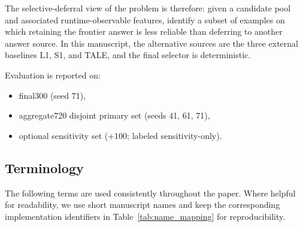 The selective-deferral view of the problem is therefore: given a candidate pool
and associated runtime-observable features, identify a subset of examples on which
retaining the frontier answer is less reliable than deferring to another answer
source. In this manuscript, the alternative sources are the three external
baselines L1, S1, and TALE, and the final selector is deterministic.

Evaluation is reported on:
\begin{itemize}
    \item final300 (seed 71),
    \item aggregate720 disjoint primary set (seeds 41, 61, 71),
    \item optional sensitivity set (+100; labeled sensitivity-only).
\end{itemize}

\subsection{Terminology}
\label{sec:terminology}

The following terms are used consistently throughout the paper.
Where helpful for readability, we use short manuscript names and keep the corresponding implementation identifiers in Table~\ref{tab:name_mapping} for reproducibility.

